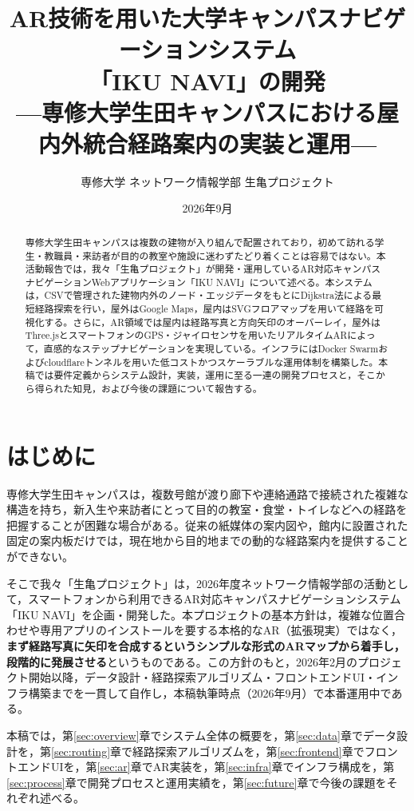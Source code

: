 \documentclass[a4paper,10.5pt]{ltjsarticle}
\title{\textbf{AR技術を用いた大学キャンパスナビゲーションシステム\\
「IKU NAVI」の開発 \\[2mm]
\large ---専修大学生田キャンパスにおける屋内外統合経路案内の実装と運用---}}
\author{専修大学 ネットワーク情報学部 生亀プロジェクト}
\date{2026年9月}
\begin{document}
\maketitle

\begin{abstract}
専修大学生田キャンパスは複数の建物が入り組んで配置されており，初めて訪れる学生・教職員・来訪者が目的の教室や施設に迷わずたどり着くことは容易ではない。本活動報告では，我々「生亀プロジェクト」が開発・運用しているAR対応キャンパスナビゲーションWebアプリケーション「IKU NAVI」について述べる。本システムは，CSVで管理された建物内外のノード・エッジデータをもとにDijkstra法による最短経路探索を行い，屋外はGoogle Maps，屋内はSVGフロアマップを用いて経路を可視化する。さらに，AR領域では屋内は経路写真と方向矢印のオーバーレイ，屋外はThree.jsとスマートフォンのGPS・ジャイロセンサを用いたリアルタイムARによって，直感的なステップナビゲーションを実現している。インフラにはDocker Swarmおよびcloudflareトンネルを用いた低コストかつスケーラブルな運用体制を構築した。本稿では要件定義からシステム設計，実装，運用に至る一連の開発プロセスと，そこから得られた知見，および今後の課題について報告する。
\end{abstract}

\tableofcontents

\section{はじめに}

専修大学生田キャンパスは，複数号館が渡り廊下や連絡通路で接続された複雑な構造を持ち，新入生や来訪者にとって目的の教室・食堂・トイレなどへの経路を把握することが困難な場合がある。従来の紙媒体の案内図や，館内に設置された固定の案内板だけでは，現在地から目的地までの動的な経路案内を提供することができない。

そこで我々「生亀プロジェクト」は，2026年度ネットワーク情報学部の活動として，スマートフォンから利用できるAR対応キャンパスナビゲーションシステム「IKU NAVI」を企画・開発した。本プロジェクトの基本方針は，複雑な位置合わせや専用アプリのインストールを要する本格的なAR（拡張現実）ではなく，\textbf{まず経路写真に矢印を合成するというシンプルな形式のARマップから着手し，段階的に発展させる}というものである。この方針のもと，2026年2月のプロジェクト開始以降，データ設計・経路探索アルゴリズム・フロントエンドUI・インフラ構築までを一貫して自作し，本稿執筆時点（2026年9月）で本番運用中である。

本稿では，第\ref{sec:overview}章でシステム全体の概要を，第\ref{sec:data}章でデータ設計を，第\ref{sec:routing}章で経路探索アルゴリズムを，第\ref{sec:frontend}章でフロントエンドUIを，第\ref{sec:ar}章でAR実装を，第\ref{sec:infra}章でインフラ構成を，第\ref{sec:process}章で開発プロセスと運用実績を，第\ref{sec:future}章で今後の課題をそれぞれ述べる。
\end{document}
